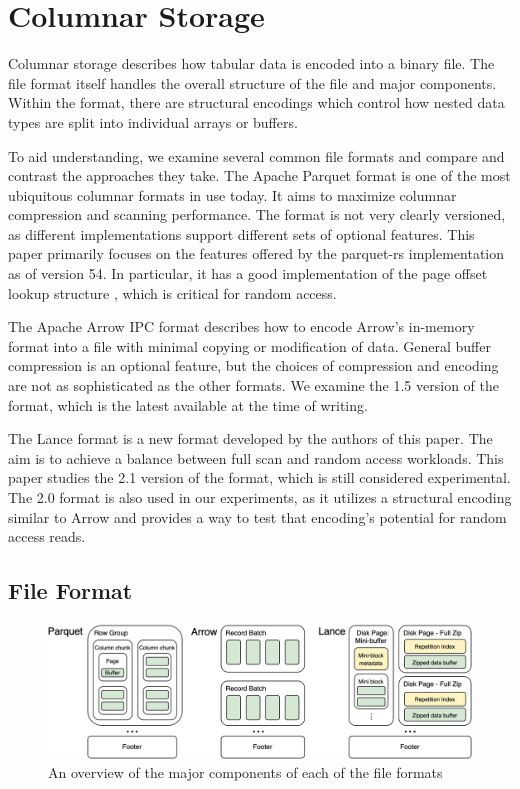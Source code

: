 \documentclass[sigconf, nonacm]{acmart}
\begin{document}
\section{Columnar Storage}

Columnar storage describes how tabular data is encoded into a binary file.  The file format itself handles the overall structure of the file and major components.  Within the format, there are structural encodings which control how nested data types are split into individual arrays or buffers.

To aid understanding, we examine several common file formats and compare and contrast the approaches they take.  The Apache Parquet format is one of the most ubiquitous columnar formats in use today.  It aims to maximize columnar compression and scanning performance.  The format is not very clearly versioned, as different implementations support different sets of optional features.  This paper primarily focuses on the features offered by the parquet-rs implementation as of version 54.  In particular, it has a good implementation of the page offset lookup structure \cite{PqPageOffset}, which is critical for random access.

The Apache Arrow IPC format\cite{ArrowFile} describes how to encode Arrow's in-memory format into a file with minimal copying or modification of data.  General buffer compression is an optional feature, but the choices of compression and encoding are not as sophisticated as the other formats.  We examine the 1.5 version of the format, which is the latest available at the time of writing.

The Lance format is a new format developed by the authors of this paper.  The aim is to achieve a balance between full scan and random access workloads.  This paper studies the 2.1 version of the format, which is still considered experimental.  The 2.0 format is also used in our experiments, as it utilizes a structural encoding similar to Arrow and provides a way to test that encoding's potential for random access reads.

\subsection{File Format}

\begin{figure}
    \centering
    \includegraphics[width=18cm]{figures/format-comparison.png}
    \caption{An overview of the major components of each of the file formats}
    \label{fig:encodings-overview}
\end{figure}
\end{document}
